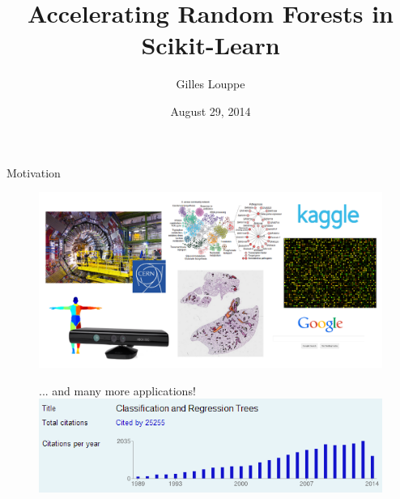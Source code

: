 \documentclass{beamer}
\title{Accelerating Random Forests in Scikit-Learn}
\author{Gilles Louppe}
\institute{Université de Liège, Belgium}
\date{August 29, 2014}
\begin{document}
\begin{frame}
\titlepage
\end{frame}



\begin{frame}{Motivation}

\vspace{-0.5cm}
\begin{figure}
\includegraphics[scale=0.4]{./figures/motivation.png}
\end{figure}

\vspace{-0.5cm}
\begin{figure}
... and many more applications! \\
\includegraphics[scale=0.4]{./figures/cart-citations.png}
\end{figure}

%
\end{frame}


\end{document}
